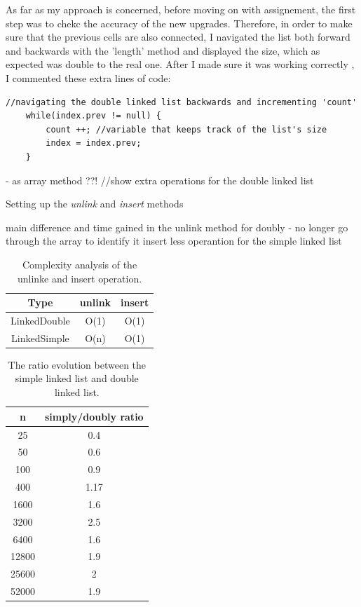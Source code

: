 \documentclass[a4paper,11pt]{article}
\begin{document}
As far as my approach is concerned, before moving on with assignement, the first step was to chekc the accuracy of the new upgrades.
Therefore, in order to make sure that the previous cells are also connected, I navigated the list both forward and backwards 
with the 'length' method and displayed the size, which as expected was double to the real one. After I made sure it was working correctly , I commented
these extra lines of code: 

\begin{verbatim}
//navigating the double linked list backwards and incrementing 'count'
    while(index.prev != null) {
        count ++; //variable that keeps track of the list's size
        index = index.prev;
    }

\end{verbatim}

- as array method  ??!
//show extra operations for the double linked list 


Setting up the \textit{unlink} and \textit{insert} methods

main difference and time gained in the unlink method for doubly - no longer go through the array to identify it 
insert less operantion for the simple linked list 

\begin{table}[h!]
    \centering
    \begin{tabular}{||c c c||} 
    \hline
    Type & unlink & insert\\ [0.5ex]
    \hline
    LinkedDouble& O(1) & O(1) \\
    LinkedSimple & O(n) & O(1) \\ [1ex] 
    \hline
    \end{tabular}
    \caption{Complexity analysis of the unlinke and insert operation.} 
    \label{table:1}
\end{table}


\begin{table}[h!]
    \centering
    \begin{tabular}{||c c||} 
    \hline
     n & simply/doubly ratio \\ [0.5ex]
    \hline
    25 & 0.4 \\
    50 & 0.6 \\
    100 & 0.9 \\
    400 & 1.17 \\
    1600 & 1.6 \\
    3200 & 2.5 \\
    6400 & 1.6 \\
    12800 & 1.9 \\
    25600 & 2 \\
    52000 & 1.9 \\[1ex]
    \hline
    \end{tabular}
    \caption{The ratio evolution between the simple linked list and double linked list.} 
    \label{table:2}
\end{table}
\end{document}
